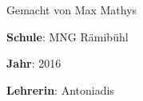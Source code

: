 {\Large Gemacht von Max Mathys}

\vspace{.7em}

\textbf{Schule}: MNG Rämibühl
\vspace{.2em}

\textbf{Jahr}: 2016
\vspace{.2em}

\textbf{Lehrerin}: Antoniadis